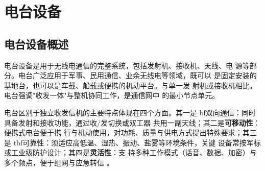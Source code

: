 
\chapter{电台设备}
\label{chap:radio_station}

\section{电台设备概述}
\label{sec:radio_station_intro}

电台设备是用于无线电通信的完整系统，包括发射机、接收机、天线、电
源等部分。电台广泛应用于军事、民用通信、业余无线电等领域，既可以
是固定安装的基地台，也可以是车载、船载或便携的机动平台。与单一发
射机或接收机相比，电台强调"收发一体"与整机协同工作，是通信网中
的最小节点单元。

电台区别于独立收发信机的主要特点体现在四个方面。其一是\text
bf{双向通信}：同时具备发射和接收功能，通过收/发切换或双工器
共用一副天线；其二是\textbf{可移动性}：便携式电台便于携
行与机动使用，对功耗、质量与供电方式提出特殊要求；其三是\tex
tbf{可靠性}：须适应高低温、湿热、振动、盐雾等环境条件，关键
设备常按军标或工业级防护设计；其四是\textbf{灵活性}：支
持多种工作模式（话音、数据、加密）与多个频点，便于组网与应急转信
。

